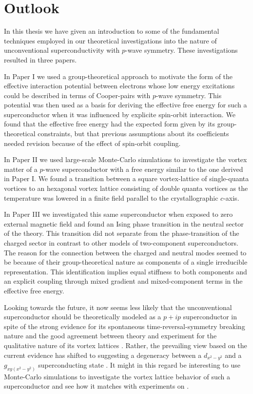 \chapter{Outlook}\noindent
%
%
In this thesis we have given an introduction to some of the fundamental techniques employed in our theoretical investigations
into the nature of unconventional superconductivity with $p$-wave symmetry. These investigations resulted in three papers.

In Paper I we used a group-theoretical approach to
motivate the form of the effective interaction potential between electrons whose low energy excitations could be described
in terms of Cooper-pairs with $p$-wave symmetry. This potential was then used as a basis for deriving the effective free energy
for such a superconductor when it was influenced by explicite spin-orbit interaction. We found that the effective free energy
had the expected form given by its group-theoretical constraints, but that previous assumptions about its coefficients needed
revision because of the effect of spin-orbit coupling.

In Paper II we used large-scale Monte-Carlo simulations to investigate the vortex matter of a $p$-wave superconductor with a free
energy similar to the one derived in Paper I. We found a transition between a square vortex-lattice of single-quanta vortices
to an hexagonal vortex lattice consisting of double quanta vortices as the temperature was lowered in a finite field parallel
to the crystallographic $c$-axis.

In Paper III we investigated this same superconductor when exposed to zero external magnetic field and found an Ising phase transition
in the neutral sector of the theory. This transition did not separate from the phase-transition of the charged sector in contrast
to other models of two-component superconductors. The reason for the connection between the charged and neutral modes seemed to
be because of their group-theoretical nature as components of a single
irreducible representation. This identification implies equal stiffness to both components and an explicit coupling through mixed gradient
and mixed-component terms in the effective free energy.

Looking towards the future, it now seems less likely that the unconventional superconductor  should be theoretically
modeled as a $p+ip$ superconductor in spite of the strong evidence for its spontaneous time-reversal-symmetry breaking nature
\cite{Luke98,Xia06,Grinenko20} and the good
agreement between theory and experiment for the qualitative nature of its vortex lattices \cite{Ray14,AsleGaraud16}. Rather, the
prevailing view based on the current evidence has shifted to suggesting a degeneracy between a $d_{x^2-y^2}$ and a $g_{xy(x^2-y^2)}$ 
superconducting state \cite{Kivelson20,Ghosh21}. It might in this regard be interesting to use Monte-Carlo simulations to
investigate the vortex lattice behavior of such a superconductor and see how it matches with experiments on .

